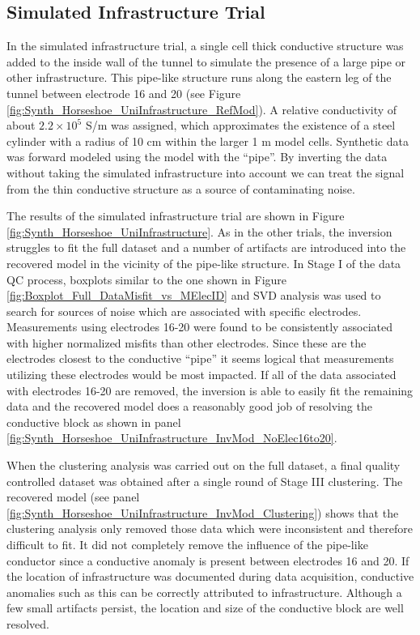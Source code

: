 \documentclass[final,authoryear,5p,times,twocolumn]{elsarticle}
\begin{document}
\subsection{Simulated Infrastructure Trial}

In the simulated infrastructure trial, a single cell thick conductive structure was added to the inside wall of the tunnel to simulate the presence of a large pipe or other infrastructure. This pipe-like structure runs along the eastern leg of the tunnel between electrode 16 and 20 (see Figure \ref{fig:Synth_Horseshoe_UniInfrastructure_RefMod}). A relative conductivity of about $2.2 \times 10^5$ S/m was assigned, which approximates the existence of a steel cylinder with a radius of 10 cm within the larger 1 m model cells. Synthetic data was forward modeled using the model with the ``pipe''. By inverting the data without taking the simulated infrastructure into account we can treat the signal from the thin conductive structure as a source of contaminating noise.

The results of the simulated infrastructure trial are shown in Figure \ref{fig:Synth_Horseshoe_UniInfrastructure}. As in the other trials, the inversion struggles to fit the full dataset and a number of artifacts are introduced into the recovered model in the vicinity of the pipe-like structure. In Stage I of the data QC process, boxplots similar to the one shown in Figure \ref{fig:Boxplot_Full_DataMisfit_vs_MElecID} and SVD analysis was used to search for sources of noise which are associated with specific electrodes. Measurements using electrodes 16-20 were found to be consistently associated with higher normalized misfits than other electrodes. Since these are the electrodes closest to the conductive ``pipe'' it seems logical that measurements utilizing these electrodes would be most impacted. If all of the data associated with electrodes 16-20 are removed, the inversion is able to easily fit the remaining data and the recovered model does a reasonably good job of resolving the conductive block as shown in panel \ref{fig:Synth_Horseshoe_UniInfrastructure_InvMod_NoElec16to20}.

When the clustering analysis was carried out on the full dataset, a final quality controlled dataset was obtained after a single round of Stage III clustering. The recovered model (see panel \ref{fig:Synth_Horseshoe_UniInfrastructure_InvMod_Clustering}) shows that the clustering analysis only removed those data which were inconsistent and therefore difficult to fit. It did not completely remove the influence of the pipe-like conductor since a conductive anomaly is present between electrodes 16 and 20. If the location of infrastructure was documented during data acquisition, conductive anomalies such as this can be correctly attributed to infrastructure. Although a few small artifacts persist, the location and size of the conductive block are well resolved.
\end{document}
